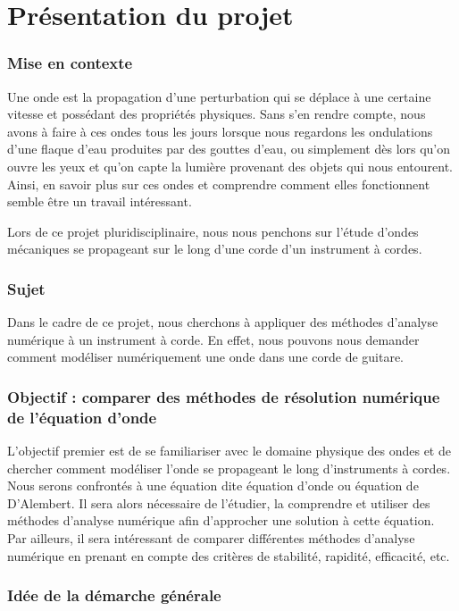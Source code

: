 \part{Présentation du projet}

\section{Mise en contexte}

Une onde est la propagation d'une perturbation qui se déplace à une certaine vitesse et possédant des propriétés physiques. Sans s'en rendre compte, nous avons à faire à ces ondes tous les jours lorsque nous regardons les ondulations d'une flaque d'eau produites par des gouttes d'eau, ou simplement dès lors qu'on ouvre les yeux et qu'on capte la lumière provenant des objets qui nous entourent. Ainsi, en savoir plus sur ces ondes et comprendre comment elles fonctionnent semble être un travail intéressant.

Lors de ce projet pluridisciplinaire, nous nous penchons sur l'étude d'ondes mécaniques se propageant sur le long d'une corde d'un instrument à cordes.


\section{Sujet}

Dans le cadre de ce projet, nous cherchons à appliquer des méthodes d'analyse numérique à un instrument à corde. En effet, nous pouvons nous demander comment modéliser numériquement une onde dans une corde de guitare. 

\section{Objectif : comparer des méthodes de résolution numérique de l'équation d'onde}

L'objectif premier est de se familiariser avec le domaine physique des ondes et de chercher comment modéliser l'onde se propageant le long d'instruments à cordes. Nous serons confrontés à une équation dite équation d'onde ou équation de D'Alembert. Il sera alors nécessaire de l'étudier, la comprendre et utiliser des méthodes d'analyse numérique afin d'approcher une solution à cette équation. Par ailleurs, il sera intéressant de comparer différentes méthodes d'analyse numérique en prenant en compte des critères de stabilité, rapidité, efficacité, etc.

\section{Idée de la démarche générale}

